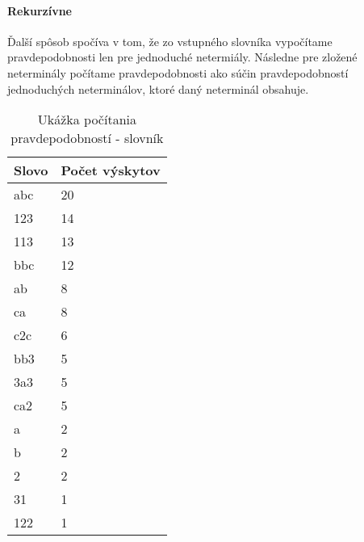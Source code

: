 \paragraph{Rekurzívne}
Ďalší spôsob spočíva v tom, že zo vstupného slovníka vypočítame pravdepodobnosti len pre jednoduché netermiály. Následne pre zložené neterminály počítame pravdepodobnosti ako súčin pravdepodobností jednoduchých neterminálov, ktoré daný neterminál obsahuje.

\begin{table}[]
\centering
\caption{Ukážka počítania pravdepodobností - slovník}
\label{slovnikPP}
\begin{tabular}{ll}
Slovo & Počet výskytov \\ \hline
abc & 20 \\ 
123 & 14 \\ 
113 & 13 \\ 
bbc & 12 \\ 
ab & 8 \\ 
ca & 8 \\ 
c2c & 6 \\ 
bb3 & 5 \\ 
3a3 & 5 \\ 
ca2 & 5 \\ 
a & 2 \\ 
b & 2 \\ 
2 & 2 \\ 
31 & 1 \\ 
122 & 1
\end{tabular}
\end{table}


